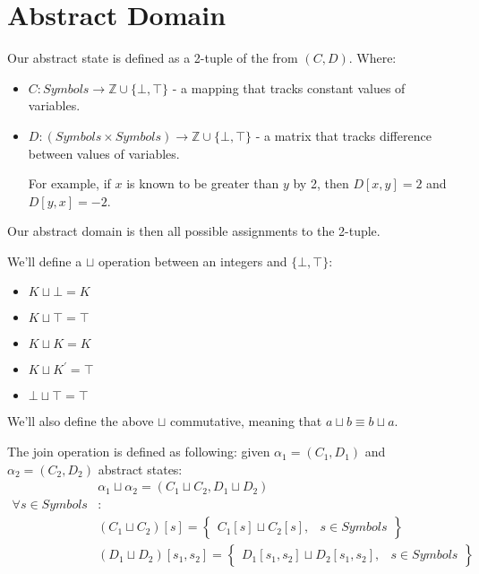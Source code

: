 \section*{Abstract Domain}
Our abstract state is defined as a 2-tuple of the from $(C,D)$. Where:
\begin{itemize}
	\item $C: Symbols \rightarrow \mathbb{Z}\cup \{\bot, \top\}$ - a mapping that tracks constant values of variables.
	\item $D: (Symbols \times Symbols )\rightarrow \mathbb{Z}\cup \{\bot, \top\}$ - a matrix that tracks difference between values of variables.
	
	For example, if $x$ is known to be greater than $y$ by 2, then $D[x,y] = 2$ and $D[y,x] = -2$.

\end{itemize}
Our abstract domain is then all possible assignments to the 2-tuple.

We'll define a $\sqcup$ operation between an integers and $\{\bot, \top\}$:
\begin{itemize}
	\item $K \sqcup \bot = K$
	\item $K \sqcup \top = \top$
	\item $K \sqcup K = K$
	\item $K \sqcup K^\prime = \top$
	\item $\bot \sqcup \top = \top$
\end{itemize}
We'll also define the above $\sqcup$ commutative, meaning that $a\sqcup b \equiv b \sqcup a$.

The join operation is defined as following: given $\alpha_1=(C_1, D_1)$ and $\alpha_2=(C_2,D_2)$ abstract states:
\begin{align*}
&\alpha_1\sqcup\alpha_2=(C_1\sqcup C_2, D_1 \sqcup D_2) \\
\forall s \in Symbols&:  \\
&(C_1\sqcup C_2)[s] = \left.
	\begin{cases}
		C_1[s]\sqcup C_2[s], & s \in Symbols
	\end{cases}
\right\} \\
&(D_1\sqcup D_2)[s_1, s_2] = \left.
	\begin{cases}
		D_1[s_1, s_2]\sqcup D_2[s_1, s_2], & s \in Symbols
	\end{cases}
\right\}
\end{align*}